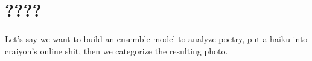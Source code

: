 \setchapterpreamble[u]{\margintoc}
\chapter{????}

Let's say we want to build an ensemble model to analyze poetry, put a haiku into craiyon's online shit, then we categorize the resulting photo. 


